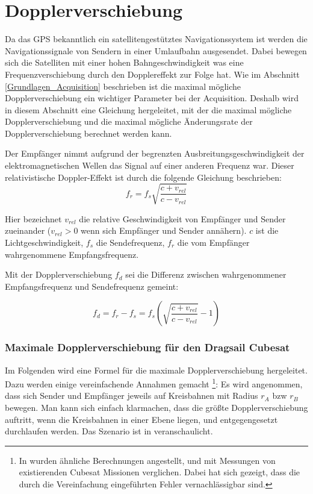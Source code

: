\section{Dopplerverschiebung}
\label{Dopplereffekt}
Da das GPS bekanntlich ein satellitengestütztes Navigationssystem ist werden die Navigationssignale von Sendern in einer Umlaufbahn ausgesendet. Dabei bewegen sich die Satelliten mit einer hohen Bahngeschwindigkeit was eine Frequenzverschiebung durch den Dopplereffekt zur Folge hat. Wie im Abschnitt \ref{Grundlagen_Acquisition} beschrieben ist die maximal mögliche Dopplerverschiebung ein wichtiger Parameter bei der Acquisition. Deshalb wird in diesem Abschnitt eine Gleichung hergeleitet, mit der die maximal mögliche Dopplerverschiebung und die maximal mögliche Änderungsrate der Dopplerverschiebung berechnet werden kann.

Der Empfänger nimmt aufgrund der begrenzten Ausbreitungsgeschwindigkeit der elektromagnetischen Wellen das Signal auf einer anderen Frequenz war. Dieser relativistische Doppler-Effekt ist durch die folgende Gleichung beschrieben:
\begin{equation}
    f_r=f_s \sqrt{\frac{c+v_{rel}}{c-v_{rel}}}
\end{equation}

Hier bezeichnet $v_{rel}$ die relative Geschwindigkeit von Empfänger und Sender zueinander ($v_{rel}>0$ wenn sich Empfänger und Sender annähern). $c$ ist die Lichtgeschwindigkeit, $f_s$ die Sendefrequenz, $f_r$ die vom Empfänger wahrgenommene Empfangsfrequenz.

Mit der Dopplerverschiebung $f_d$ sei die Differenz zwischen wahrgenommener Empfangsfrequenz und Sendefrequenz gemeint:

\begin{equation}
\label{EqDoppler}
    f_d=f_r-f_s=f_s \left( \sqrt{\frac{c+v_{rel}}{c-v_{rel}}}-1 \right)
\end{equation}

\subsubsection{Maximale Dopplerverschiebung für den Dragsail Cubesat}\label{maxdopplershift}
Im Folgenden wird eine Formel für die  maximale Dopplerverschiebung hergeleitet. 
Dazu werden einige vereinfachende Annahmen gemacht \footnote{In \cite{Birklykke2010} wurden ähnliche Berechnungen angestellt, und mit Messungen von existierenden Cubesat Missionen verglichen. Dabei hat sich gezeigt, dass die durch die Vereinfachung eingeführten Fehler vernachlässigbar sind.}: Es wird angenommen, dass sich Sender und Empfänger jeweils auf Kreisbahnen mit Radius $r_A$ bzw $r_B$ bewegen. Man kann sich einfach klarmachen, dass die größte Dopplerverschiebung auftritt, wenn die Kreisbahnen in einer Ebene liegen, und entgegengesetzt durchlaufen werden. Das Szenario ist in  veranschaulicht.

